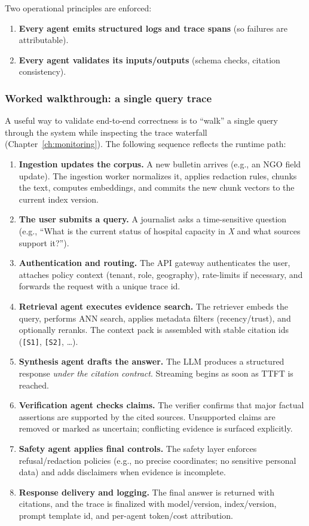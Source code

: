 Two operational principles are enforced:
\begin{enumerate}
    \item \textbf{Every agent emits structured logs and trace spans} (so failures are attributable).
    \item \textbf{Every agent validates its inputs/outputs} (schema checks, citation consistency).
\end{enumerate}

\subsubsection{Worked walkthrough: a single query trace}
\label{sec:ishtar-query-trace}

A useful way to validate end-to-end correctness is to ``walk'' a single query through the system while inspecting the trace waterfall (Chapter~\ref{ch:monitoring}).
The following sequence reflects the \ishtar{} runtime path:

\begin{enumerate}[leftmargin=*]
    \item \textbf{Ingestion updates the corpus.} A new bulletin arrives (e.g., an NGO field update). The ingestion worker normalizes it, applies redaction rules, chunks the text, computes embeddings, and commits the new chunk vectors to the current index version.
    \item \textbf{The user submits a query.} A journalist asks a time-sensitive question (e.g., ``What is the current status of hospital capacity in \emph{X} and what sources support it?'').
    \item \textbf{Authentication and routing.} The API gateway authenticates the user, attaches policy context (tenant, role, geography), rate-limits if necessary, and forwards the request with a unique trace id.
    \item \textbf{Retrieval agent executes evidence search.} The retriever embeds the query, performs ANN search, applies metadata filters (recency/trust), and optionally reranks. The context pack is assembled with stable citation ids (\texttt{[S1]}, \texttt{[S2]}, \dots).
    \item \textbf{Synthesis agent drafts the answer.} The LLM produces a structured response \emph{under the citation contract}. Streaming begins as soon as TTFT is reached.
    \item \textbf{Verification agent checks claims.} The verifier confirms that major factual assertions are supported by the cited sources. Unsupported claims are removed or marked as uncertain; conflicting evidence is surfaced explicitly.
    \item \textbf{Safety agent applies final controls.} The safety layer enforces refusal/redaction policies (e.g., no precise coordinates; no sensitive personal data) and adds disclaimers when evidence is incomplete.
    \item \textbf{Response delivery and logging.} The final answer is returned with citations, and the trace is finalized with model/version, index/version, prompt template id, and per-agent token/cost attribution.
\end{enumerate}

